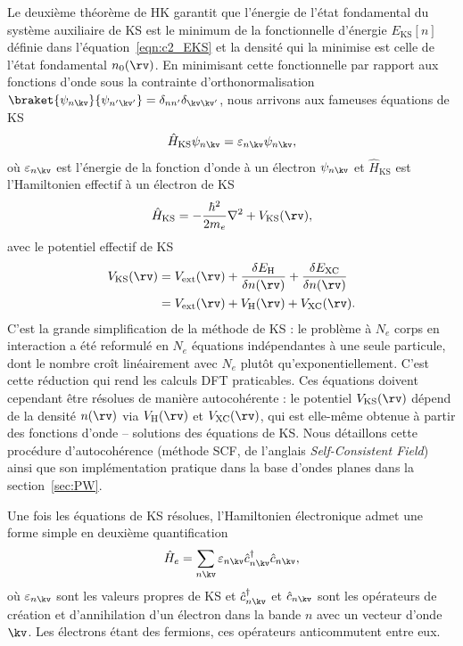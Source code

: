 
Le deuxième théorème de HK garantit que l'énergie de l'état fondamental du système auxiliaire de KS est le minimum de la fonctionnelle d'énergie $E_\text{KS}[n]$ définie dans l'équation~\eqref{eqn:c2_EKS} et la densité qui la minimise est celle de l'état fondamental $n_0(\rv)$. En minimisant cette fonctionnelle par rapport aux fonctions d'onde sous la contrainte d'orthonormalisation $\braket{\psi_{n\kv}}{\psi_{n'\kv'}}=\delta_{nn'}\delta_{\kv\kv'}$, nous arrivons aux fameuses équations de KS
\begin{equation}
    \label{eqn:c2_KS}
    \hat{H}_\text{KS}\psi_{n\kv}=\varepsilon_{n\kv}\psi_{n\kv},
\end{equation}
où $\varepsilon_{n\kv}$ est l'énergie de la fonction d'onde à un électron $\psi_{n\kv}$ et $\hat{H}_\text{KS}$ est l'Hamiltonien effectif à un électron de KS
\begin{equation}
    \label{eqn:c2_HKS}
    \hat{H}_\text{KS}=-\frac{\hbar^2}{2m_e}\nabla^2+V_\text{KS}(\rv),
\end{equation}
avec le potentiel effectif de KS
\begin{align}
    \label{eqn:c2_VKS}
    V_\text{KS}(\rv)&=V_\text{ext}(\rv)+\frac{\delta E_\text{H}}{\delta n(\rv)}+\frac{\delta E_\text{XC}}{\delta n(\rv)}\notag\\
    &=V_\text{ext}(\rv)+V_\text{H}(\rv)+V_\text{XC}(\rv).
\end{align}
C'est la grande simplification de la méthode de KS : le problème à $N_e$ corps en interaction a été reformulé en $N_e$ équations indépendantes à une seule particule, dont le nombre croît linéairement avec $N_e$ plutôt qu'exponentiellement. C'est cette réduction qui rend les calculs DFT praticables. Ces équations doivent cependant être résolues de manière autocohérente : le potentiel $V_\text{KS}(\rv)$ dépend de la densité $n(\rv)$ via $V_\text{H}(\rv)$ et $V_\text{XC}(\rv)$, qui est elle-même obtenue à partir des fonctions d'onde -- solutions des équations de KS. Nous détaillons cette procédure d'autocohérence (méthode SCF, de l'anglais \textit{Self-Consistent Field}) ainsi que son implémentation pratique dans la base d'ondes planes dans la section~\ref{sec:PW}.

Une fois les équations de KS résolues, l'Hamiltonien électronique admet une forme simple en deuxième quantification
\begin{equation}
    \hat{H}_e = \sum_{n\kv}\varepsilon_{n\kv}\hat{c}^\dag_{n\kv}\hat{c}_{n\kv},
\end{equation}
où $\varepsilon_{n\kv}$ sont les valeurs propres de KS et $\hat{c}^\dag_{n\kv}$ et $\hat{c}_{n\kv}$ sont les opérateurs de création et d'annihilation d'un électron dans la bande $n$ avec un vecteur d'onde $\kv$. Les électrons étant des fermions, ces opérateurs anticommutent entre eux. 

